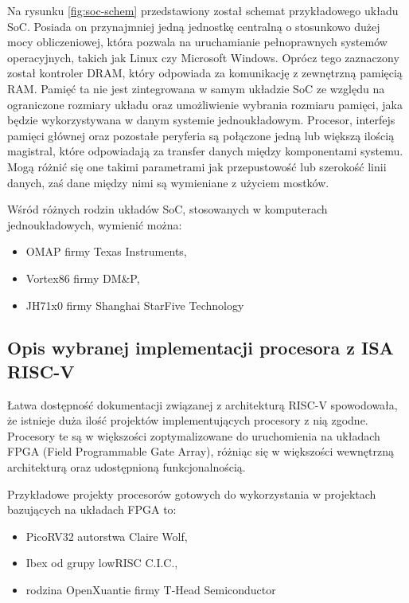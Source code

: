 Na rysunku \ref{fig:soc-schem} przedstawiony został schemat przykładowego układu SoC. Posiada on przynajmniej jedną jednostkę centralną o stosunkowo dużej mocy obliczeniowej, która pozwala na uruchamianie pełnoprawnych systemów operacyjnych, takich jak Linux czy Microsoft Windows. Oprócz tego zaznaczony został kontroler DRAM, który odpowiada za komunikację z zewnętrzną pamięcią RAM. Pamięć ta nie jest zintegrowana w samym układzie SoC ze względu na ograniczone rozmiary układu oraz umożliwienie wybrania rozmiaru pamięci, jaka będzie wykorzystywana w danym systemie jednoukładowym. Procesor, interfejs pamięci głównej oraz pozostałe peryferia są połączone jedną lub większą ilością magistral, które odpowiadają za transfer danych między komponentami systemu. Mogą różnić się one takimi parametrami jak przepustowość lub szerokość linii danych, zaś dane między nimi są wymieniane z użyciem mostków.

Wśród różnych rodzin układów SoC, stosowanych w komputerach jednoukładowych, wymienić można:
\begin{itemize}
	\item OMAP\cite{omap3530} firmy Texas Instruments,
	\item Vortex86\cite{vortex86ex2} firmy DM\&P,
	\item JH71x0\cite{jh7110} firmy Shanghai StarFive Technology
\end{itemize}

\subsection{Opis wybranej implementacji procesora z ISA RISC-V}

Łatwa dostępność dokumentacji związanej z architekturą RISC-V spowodowała, że istnieje duża ilość projektów implementujących procesory z nią zgodne. Procesory te są w większości zoptymalizowane do uruchomienia na układach FPGA (Field Programmable Gate Array), różniąc się w większości wewnętrzną architekturą oraz udostępnioną funkcjonalnością.

Przykładowe projekty procesorów gotowych do wykorzystania w projektach bazujących na układach FPGA to:
\begin{itemize}
	\item PicoRV32\cite{picorv32} autorstwa Claire Wolf,
	\item Ibex\cite{ibex} od grupy lowRISC C.I.C.,
	\item rodzina OpenXuantie\cite{openxuantie} firmy T-Head Semiconductor
\end{itemize}

